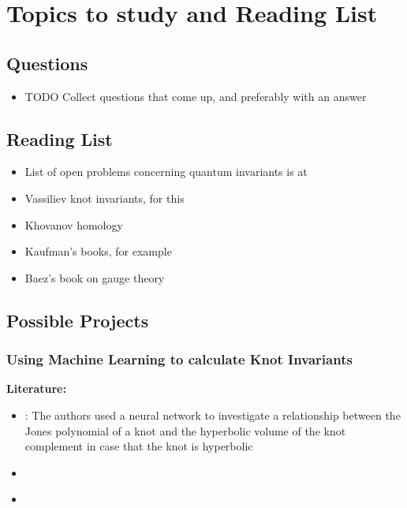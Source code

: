 \chapter{Topics to study and Reading List}

\section{Questions}

\begin{itemize}
	\item TODO Collect questions that come up, and preferably
	with an answer
\end{itemize}

\section{Reading List}

\begin{itemize}
	\item List of open problems concerning quantum invariants
		is at
		\citep{ohtsuki2002problems}
		
	\item Vassiliev knot invariants, for this
		\citep{bar1995vassiliev}
		
	\item Khovanov homology
		\citep{bar2005khovanov}
	
	\item Kaufman's books, for example
		\citep{kauffman2001knots}
		
	\item Baez's book on gauge theory
		\citep{baez1994gauge}
\end{itemize}


\newpage
\section{Possible Projects}

\subsection{Using Machine Learning to calculate Knot Invariants}

\textbf{Literature:}
\begin{itemize}
	\item \citep{1902.05547}: The authors used a neural network
	to investigate a relationship between the Jones polynomial of a knot
	and the hyperbolic volume of the knot complement in case that the knot is
	hyperbolic
	
	\item \citep{hughes2016neural}
	
	\item \citep{bull2018machine}
\end{itemize}

